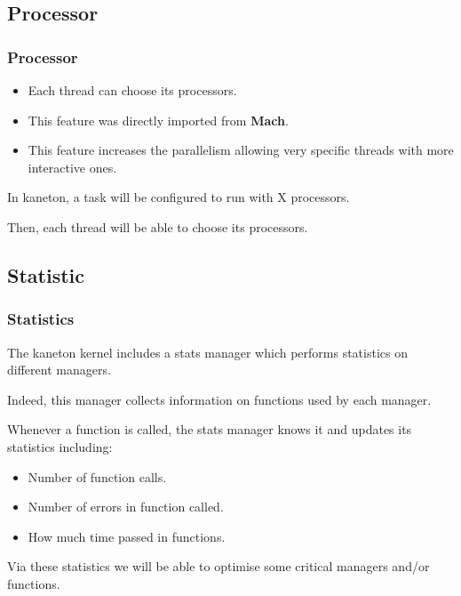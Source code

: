 %
%

\subsection{Processor}


\begin{frame}
  \frametitle{Processor}

  \begin{itemize}
    \item
      Each thread can choose its processors.
    \item
      This feature was directly imported from \textbf{Mach}.
    \item
      This feature increases the parallelism allowing very
      specific threads with more interactive ones.
  \end{itemize}

  \nl

  In kaneton, a task will be configured to run with X processors.

  \nl

  Then, each thread will be able to choose its processors.
\end{frame}

%
%

\subsection{Statistic}


\begin{frame}
  \frametitle{Statistics}

  The kaneton kernel includes a stats manager which performs statistics
  on different managers.

  \nl

  Indeed, this manager collects information on functions used by each
  manager.

  \nl

  Whenever a function is called, the stats manager knows it and updates
  its statistics including:

  \begin{itemize}[<+->]
    \item
      Number of function calls.
    \item
      Number of errors in function called.
    \item
      How much time passed in functions.
  \end{itemize}

  \nl

  Via these statistics we will be able to optimise some critical managers
  and/or functions.
\end{frame}


